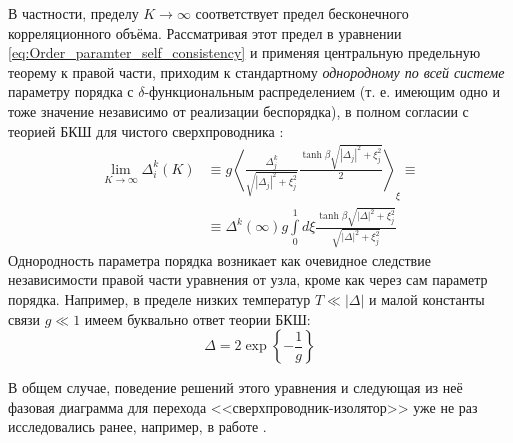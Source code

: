 В частности, пределу $K\rightarrow \infty$ соответствует предел бесконечного корреляционного объёма. Рассматривая этот предел в уравнении \eqref{eq:Order_paramter_self_consistency} и применяя центральную предельную теорему к правой части, приходим к стандартному \textit{однородному по всей системе} параметру порядка с $\delta$-функциональным распределением (т. е. имеющим одно и тоже значение независимо от реализации беспорядка), в полном согласии с теорией БКШ для чистого сверхпроводника \cite{deZhen}:
\begin{equation}
	\label{eq:Order_parameter_self_consitency_BCS_limit}
	\begin{split}
		\lim_{K\rightarrow \infty} \Delta_i^k(K) & \equiv g \left\langle \frac{\Delta^k_j}{ \sqrt{ |\Delta_j|^2 + \xi_j^2} } \frac{ \tanh \beta \sqrt{ |\Delta_j|^2 + \xi_j^2} }{2} \right\rangle_{\xi} \equiv \\
		& \equiv \Delta^k(\infty) g \int\limits_0^1 d\xi \frac{ \tanh \beta \sqrt{ |\Delta|^2 + \xi_j^2} }{ \sqrt{ |\Delta|^2 + \xi_j^2} }
	\end{split}	 
\end{equation}
Однородность параметра порядка возникает как очевидное следствие независимости правой части уравнения от узла, кроме как через сам параметр порядка.
Например, в пределе низких температур $T \ll |\Delta|$ и малой константы связи $g \ll 1$ имеем буквально ответ теории БКШ:
\begin{equation}
	\label{eq:Order_parameter_BCS_limit}
	\Delta = 2 \exp \left\{ - \frac{1}{g} \right\}
\end{equation}

В общем случае, поведение решений этого уравнения и следующая из неё фазовая диаграмма для перехода <<сверхпроводник-изолятор>> уже не раз исследовались ранее, например, в работе \cite{Feigelman_et_al_2010}.

